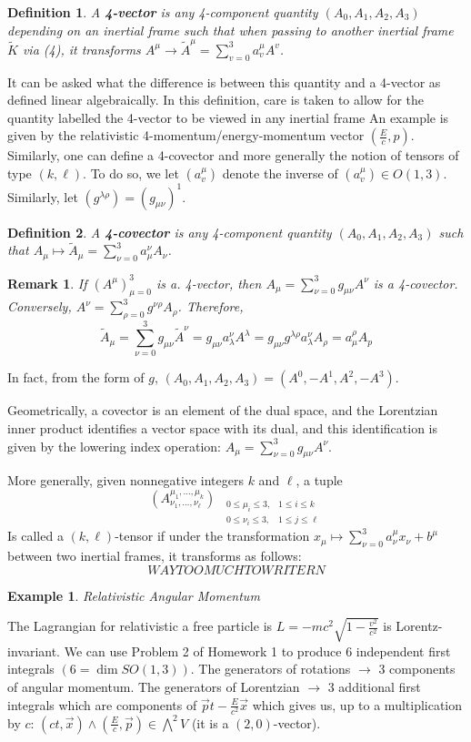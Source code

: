 \documentclass{article}
\newcommand{\nl}{\newline\newline\noindent}
\newtheorem{ex}{Example}
\newtheorem{defn}{Definition}
\newtheorem{rk}{Remark}
\begin{document}
\begin{defn}
    A \textbf{4-vector} is any 4-component quantity $(A_0,A_1,A_2,A_3)$ depending on an inertial frame such that when passing to another inertial frame $\tilde K$ via (4), it transforms $A^\mu\to \tilde A^\mu = \sum^3_{v=0}a^\mu_vA^v$.
\end{defn}
It can be asked what the difference is between this quantity and a 4-vector as defined linear algebraically. In this definition, care is taken to allow for the quantity labelled the 4-vector to be viewed in any inertial frame
An example is given by the relativistic 4-momentum/energy-momentum vector $\left(\frac{E}{c},p\right)$. Similarly, one can define a 4-covector and more generally the notion of tensors of type $(k,\ell)$. To do so, we let $(a_v^\mu)$ denote the inverse of $(a^\mu_v)\in O(1,3)$. Similarly, let $(g^{\lambda\rho}) = (g_{\mu\nu})^1$.
\begin{defn}
    A \textbf{4-covector} is any 4-component quantity $(A_0,A_1,A_2,A_3)$ such that $A_\mu\mapsto \tilde A_\mu = \sum_{\nu = 0}^3 a_\mu^\nu A_\nu$.
\end{defn}
\begin{rk}
    If $(A^\mu)_{\mu=0}^3$ is a. 4-vector, then $A_\mu = \sum_{\nu=0}^3g_{\mu\nu}A^\nu$ is a 4-covector. Conversely, $A^\nu = \sum_{\rho =0}^3 g^{\nu\rho}A_\rho$. Therefore,
    \[\tilde A_\mu =\sum_{\nu =0}^3 g_{\mu\nu}\tilde A^\nu = g_{\mu\nu}a^\nu_\lambda A^\lambda = g_{\mu\nu}g^{\lambda\rho}a^\nu_\lambda A_\rho = a_\mu^\rho A_p\]
\end{rk}
In fact, from the form of $g$, $(A_0,A_1,A_2,A_3) = (A^0,-A^1,A^2,-A^3)$. 

Geometrically, a covector is an element of the dual space, and the Lorentzian inner product identifies a vector space with its dual, and this identification is given by the lowering index operation: $A_\mu = \sum_{\nu=0}^3g_{\mu\nu}A^\nu$.

More generally, given nonnegative integers $k$ and $\ell$, a tuple
\[\left(A^{\mu_1,\dots,\mu_k}_{\nu_1,\dots,\nu_\ell}\right)_{\begin{aligned}
    &0\leq \mu_i\leq 3, &1\leq i\leq k\\
    &0\leq \nu_i\leq 3, &1\leq j\leq \ell
\end{aligned}}\]
Is called a $(k,\ell)$-tensor if under the transformation $x_\mu\mapsto \sum_{\nu = 0}^3 a^\mu_\nu x_\nu + b^\mu$ between two inertial frames, it transforms as follows:
\[WAY TOO MUCH TO WRITE RN\]
\begin{ex}
    Relativistic Angular Momentum
\end{ex}
The Lagrangian for relativistic a free particle is $L = -mc^2\sqrt{1-\frac{v^2}{c^2}}$ is Lorentz-invariant.
\nl
We can use Problem 2 of Homework 1 to produce 6 independent first integrals $(6 = \dim SO(1,3))$. The generators of rotations $\rightarrow$ 3 components of angular momentum. The generators of Lorentzian $\rightarrow$ 3 additional first integrals which are components of $\vec p t - \frac{E}{c^2}\vec x$ which gives us, up to a multiplication by $c$: $(ct,\vec x)\wedge (\frac{E}{c},\vec p)\in \bigwedge^2V$ (it is a $(2,0)$-vector).
\end{document}
